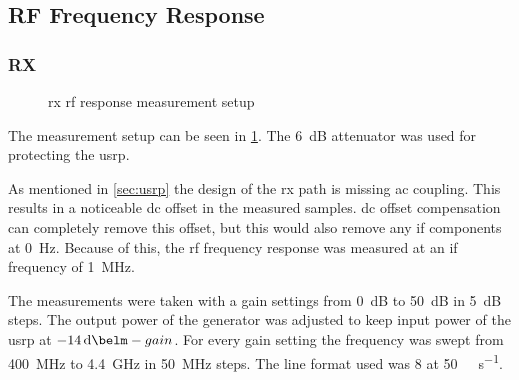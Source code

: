 \documentclass[12pt,a4paper,parskip=full,abstracton]{scrartcl}
\begin{document}
\subsection{RF Frequency Response}
\subsubsection{RX}
\label{sec:rfrx}
\begin{figure}[htb]
    \centering
    \caption{\gls{rx} \gls{rf} response measurement setup}
    \label{fig:rxrfsetup}
\end{figure}

The measurement setup can be seen in \cref{fig:rxrfsetup}. The \SI{6}{\deci\bel}
attenuator was used for protecting the \gls{usrp}.

As mentioned in \cref{sec:usrp} the design of the \gls{rx} path is missing \gls{ac}
coupling. This results in a noticeable \gls{dc} offset in the measured samples.
\gls{dc} offset compensation can completely remove this offset, but this would
also remove any \gls{if} components at \SI{0}{\hertz}. Because of this, the
\gls{rf} frequency response was measured at an \gls{if} frequency of
\SI{1}{\mega\hertz}.

The measurements were taken with a gain settings from \SI{0}{\deci\bel} to
\SI{50}{\deci\bel} in \SI{5}{\deci\bel} steps. The output power of the
generator was adjusted to keep input power of the \gls{usrp} at
$\SI{-14}{\deci\belm} - gain$. For every gain setting the
frequency was swept from \SI{400}{\mega\hertz} to \SI{4.4}{\giga\hertz} in
\SI{50}{\mega\hertz} steps. The line format used was \SI{8}{\bit} at
\SI{50}{\mega\samples\per\second}.
\end{document}
